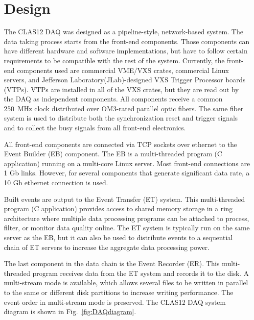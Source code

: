 \section{Design}

The CLAS12 DAQ was designed as a pipeline-style, network-based system. The data taking process starts from the front-end components. Those components can have different hardware and software implementations, but have to follow certain requirements to be compatible with the rest of the system. Currently, the front-end components used are commercial VME/VXS crates, commercial Linux servers, and Jefferson Laboratory(JLab)-designed VXS Trigger Processor boards (VTPs). VTPs are installed in all of the VXS crates, but they are read out by the DAQ as independent components. All components receive a common 250~MHz clock distributed over OM3-rated parallel optic fibers. The same fiber system is used to distribute both the synchronization reset and trigger signals and to collect the busy signals from all front-end electronics.

All front-end components are connected via TCP sockets over ethernet to the Event Builder (EB) component. The EB is a multi-threaded program (C application) running on a multi-core Linux server. Most front-end connections are 1 Gb links. However, for several components that generate significant data rate, a 10 Gb ethernet connection is used.

Built events are output to the Event Transfer (ET) system. This multi-threaded program (C application) provides access to shared memory storage in a ring architecture where multiple data processing programs can be attached to process, filter, or monitor data quality online. The ET system is typically run on the same server as the EB, but it can also be used to distribute events to a sequential chain of ET servers to increase the aggregate data processing power.

The last component in the data chain is the Event Recorder (ER). This multi-threaded program receives data from the ET system and records it to the disk. A multi-stream mode is available, which allows several files to be written in parallel to the same or different disk partitions to increase writing performance. The event order in multi-stream mode is preserved. The CLAS12 DAQ system diagram is shown in Fig.~\ref{fig:DAQdiagram}.

